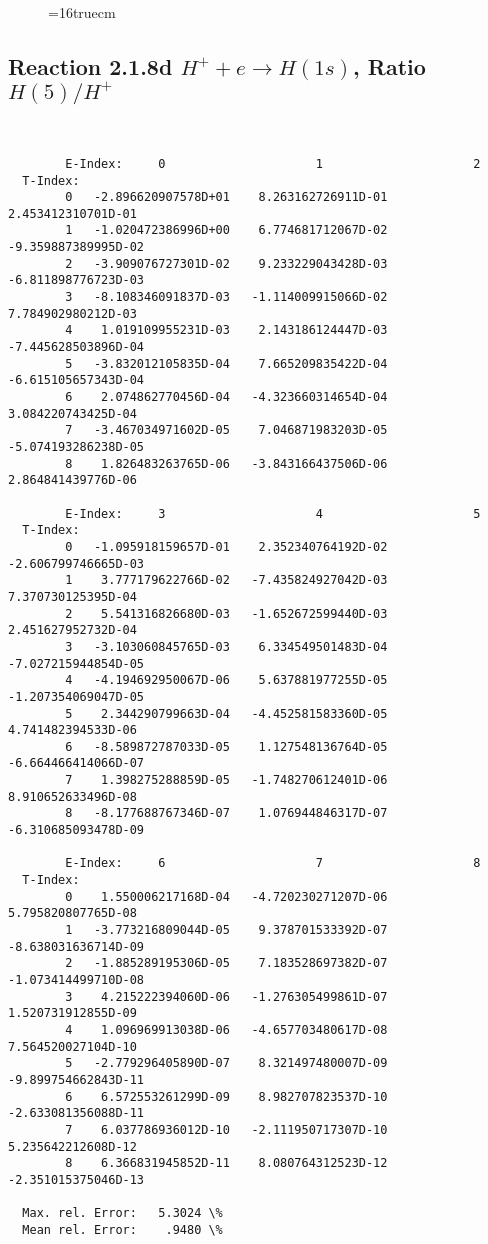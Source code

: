 \documentclass[12pt,dvipdfmx]{article}
\begin{document}
\begin{figure} \label{2.1.8rc}
\epsfxsize=16truecm
\end{figure}
\newpage



\subsection{
Reaction 2.1.8d  $H^+ + e \rightarrow H(1s) $,  Ratio $H(5)/H^+$
}

\begin{small}\begin{verbatim}


        E-Index:     0                     1                     2
  T-Index:
        0   -2.896620907578D+01    8.263162726911D-01    2.453412310701D-01
        1   -1.020472386996D+00    6.774681712067D-02   -9.359887389995D-02
        2   -3.909076727301D-02    9.233229043428D-03   -6.811898776723D-03
        3   -8.108346091837D-03   -1.114009915066D-02    7.784902980212D-03
        4    1.019109955231D-03    2.143186124447D-03   -7.445628503896D-04
        5   -3.832012105835D-04    7.665209835422D-04   -6.615105657343D-04
        6    2.074862770456D-04   -4.323660314654D-04    3.084220743425D-04
        7   -3.467034971602D-05    7.046871983203D-05   -5.074193286238D-05
        8    1.826483263765D-06   -3.843166437506D-06    2.864841439776D-06

        E-Index:     3                     4                     5
  T-Index:
        0   -1.095918159657D-01    2.352340764192D-02   -2.606799746665D-03
        1    3.777179622766D-02   -7.435824927042D-03    7.370730125395D-04
        2    5.541316826680D-03   -1.652672599440D-03    2.451627952732D-04
        3   -3.103060845765D-03    6.334549501483D-04   -7.027215944854D-05
        4   -4.194692950067D-06    5.637881977255D-05   -1.207354069047D-05
        5    2.344290799663D-04   -4.452581583360D-05    4.741482394533D-06
        6   -8.589872787033D-05    1.127548136764D-05   -6.664466414066D-07
        7    1.398275288859D-05   -1.748270612401D-06    8.910652633496D-08
        8   -8.177688767346D-07    1.076944846317D-07   -6.310685093478D-09

        E-Index:     6                     7                     8
  T-Index:
        0    1.550006217168D-04   -4.720230271207D-06    5.795820807765D-08
        1   -3.773216809044D-05    9.378701533392D-07   -8.638031636714D-09
        2   -1.885289195306D-05    7.183528697382D-07   -1.073414499710D-08
        3    4.215222394060D-06   -1.276305499861D-07    1.520731912855D-09
        4    1.096969913038D-06   -4.657703480617D-08    7.564520027104D-10
        5   -2.779296405890D-07    8.321497480007D-09   -9.899754662843D-11
        6    6.572553261299D-09    8.982707823537D-10   -2.633081356088D-11
        7    6.037786936012D-10   -2.111950717307D-10    5.235642212608D-12
        8    6.366831945852D-11    8.080764312523D-12   -2.351015375046D-13

  Max. rel. Error:   5.3024 \%
  Mean rel. Error:    .9480 \%


\end{verbatim}\end{small}
\end{document}
